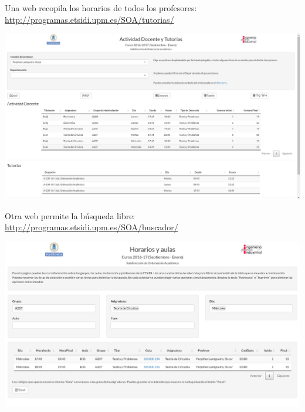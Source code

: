 \documentclass[spanish, xcolor={usenames,svgnames,dvipsnames}]{beamer}
\begin{document}
\begin{frame}[label={sec:orgecc2c45}]{}
Una web recopila los horarios de todos los profesores: \url{http://programas.etsidi.upm.es/SOA/tutorias/}

\begin{center}
\includegraphics[width=.9\linewidth]{images/tutorias.png}
\end{center}
\end{frame}

\begin{frame}[label={sec:org23fd66a}]{}
Otra web permite la búsqueda libre: \url{http://programas.etsidi.upm.es/SOA/buscador/}
\begin{center}
\includegraphics[width=.9\linewidth]{images/buscador.png}
\end{center}
\end{frame}
\end{document}
